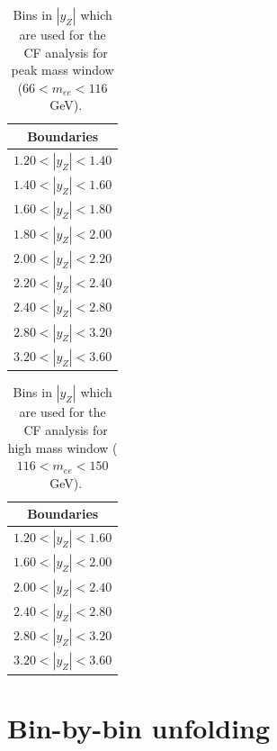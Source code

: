 \begin{table}
\centering
\begin{tabular}{c}
\hline\hline
Boundaries\\\hline
$1.20 < |y_{Z}| <1.40$\\
$1.40 < |y_{Z}| <1.60$\\
$1.60 < |y_{Z}| <1.80$\\
$1.80 < |y_{Z}| <2.00$\\
$2.00 < |y_{Z}| <2.20$\\
$2.20 < |y_{Z}| <2.40$\\
$2.40 < |y_{Z}| <2.80$\\
$2.80 < |y_{Z}| <3.20$\\
$3.20 < |y_{Z}| <3.60$\\
\hline\hline
\end{tabular}
\caption{Bins in $|y_{Z}|$ which are used for the \Zee\ CF analysis for peak mass window ($66 < m_{ee} < 116$~GeV).}
\label{tab:ZeeCS_bins_peak}
\end{table}

\begin{table}
\centering
\begin{tabular}{c}
\hline\hline
Boundaries\\\hline
$1.20 < |y_{Z}| <1.60$\\
$1.60 < |y_{Z}| <2.00$\\
$2.00 < |y_{Z}| <2.40$\\
$2.40 < |y_{Z}| <2.80$\\
$2.80 < |y_{Z}| <3.20$\\
$3.20 < |y_{Z}| <3.60$\\
\hline\hline
\end{tabular}
\caption{Bins in $|y_{Z}|$ which are used for the \Zee\ CF analysis for high mass window ($116 < m_{ee} < 150$~GeV).}
\label{tab:ZeeCS_bins_high}
\end{table}

\section{Bin-by-bin unfolding}
\label{sec:ZCS_bbb_unf}

